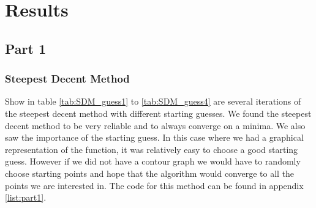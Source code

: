 \documentclass[12pt]{article}
\begin{document}
\section{Results}
\subsection{Part 1}
\subsubsection{Steepest Decent Method}
Show in table \ref{tab:SDM_guess1} to \ref{tab:SDM_guess4} are several iterations of the steepest decent method with different starting guesses. We found the steepest decent method to be very reliable and to always converge on a minima. We also saw the importance of the starting guess. In this case where we had a graphical representation of the function, it was relatively easy to choose a good starting guess. However if we did not have a contour graph we would have to randomly choose starting points and hope that the algorithm would converge to all the points we are interested in. The code for this method can be found in appendix \ref{list:part1}.
\end{document}
